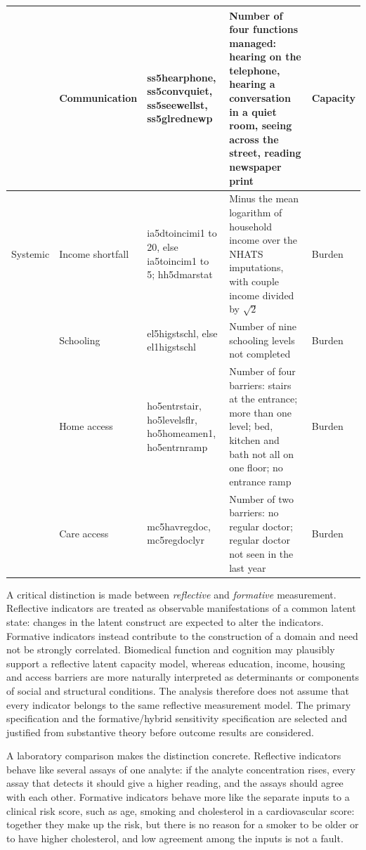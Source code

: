 {\begin{longtable}{>{\raggedright\arraybackslash}p{1.5cm} >{\raggedright\arraybackslash}p{2.1cm} >{\raggedright\arraybackslash}p{3.5cm} >{\raggedright\arraybackslash}p{4.4cm} >{\raggedright\arraybackslash}p{1.5cm}}
 & Communication & ss5hearphone, ss5convquiet, ss5seewellst, ss5glrednewp & Number of four functions managed: hearing on the telephone, hearing a conversation in a quiet room, seeing across the street, reading newspaper print & Capacity \\
\midrule
Systemic & Income shortfall & ia5dtoincimi1 to 20, else ia5toincim1 to 5; hh5dmarstat & Minus the mean logarithm of household income over the NHATS imputations, with couple income divided by $\sqrt2$ & Burden \\
 & Schooling & el5higstschl, else el1higstschl & Number of nine schooling levels not completed & Burden \\
 & Home access & ho5entrstair, ho5levelsflr, ho5homeamen1, ho5entrnramp & Number of four barriers: stairs at the entrance; more than one level; bed, kitchen and bath not all on one floor; no entrance ramp & Burden \\
 & Care access & mc5havregdoc, mc5regdoclyr & Number of two barriers: no regular doctor; regular doctor not seen in the last year & Burden \\
\bottomrule
\end{longtable}
}

A critical distinction is made between \emph{reflective} and \emph{formative \citep{bollen_lennox_1991,edwards_bagozzi_2000}} measurement. Reflective indicators are treated as observable manifestations of a common latent state: changes in the latent construct are expected to alter the indicators. Formative indicators instead contribute to the construction of a domain and need not be strongly correlated. Biomedical function and cognition may plausibly support a reflective latent capacity model, whereas education, income, housing and access barriers are more naturally interpreted as determinants or components of social and structural conditions. The analysis therefore does not assume that every indicator belongs to the same reflective measurement model. The primary specification and the formative/hybrid sensitivity specification are selected and justified from substantive theory before outcome results are considered.

A laboratory comparison makes the distinction concrete. Reflective indicators behave like several assays of one analyte: if the analyte concentration rises, every assay that detects it should give a higher reading, and the assays should agree with each other. Formative indicators behave more like the separate inputs to a clinical risk score, such as age, smoking and cholesterol in a cardiovascular score: together they make up the risk, but there is no reason for a smoker to be older or to have higher cholesterol, and low agreement among the inputs is not a fault.

